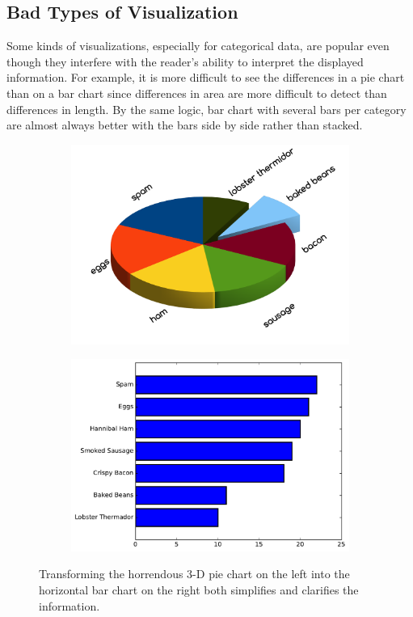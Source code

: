 \subsection*{Bad Types of Visualization} %

Some kinds of visualizations, especially for categorical data, are popular even though they interfere with the reader's ability to interpret the displayed information.
For example, it is more difficult to see the differences in a pie chart than on a bar chart since differences in area are more difficult to detect than differences in length.
By the same logic, bar chart with several bars per category are almost always better with the bars side by side rather than stacked.

\begin{figure}[H] %
\centering
\begin{subfigure}{.49\textwidth}
    \centering
    \includegraphics[width=\textwidth]{figures/bad_pie_chart.pdf}
\end{subfigure}
%
\begin{subfigure}{.49\textwidth}
    \centering
    \includegraphics[width=\textwidth]{figures/bar_2.pdf}
\end{subfigure}
\caption{Transforming the horrendous 3-D pie chart on the left into the horizontal bar chart on the right both simplifies and clarifies the information.}
\end{figure}

